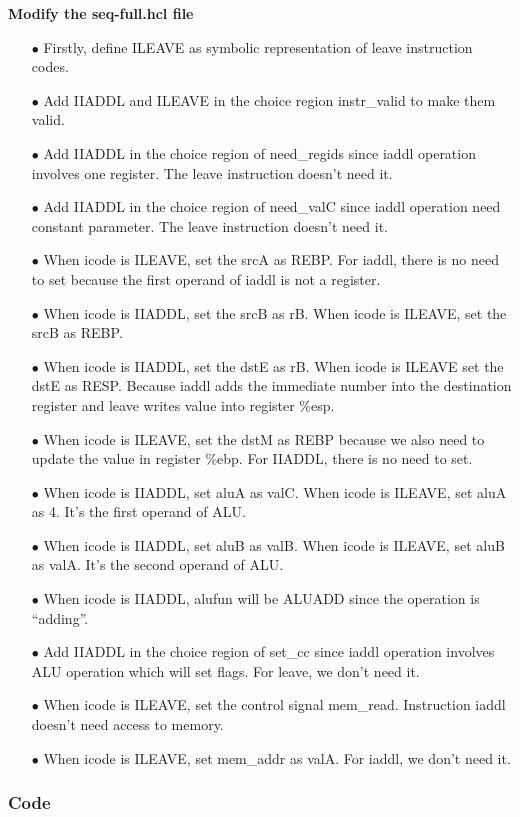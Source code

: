 \documentclass{article}
\begin{document}
\newpage
{\normalsize\bfseries Modify the {\ttfamily seq-full.hcl} file}
\begin{itemize}
\item[$\bullet$]Firstly, define ILEAVE as symbolic representation of leave instruction codes.
\item[$\bullet$]Add IIADDL and ILEAVE in the choice region instr\_valid to make them valid. 
\item[$\bullet$]Add IIADDL in the choice region of need\_regids since iaddl operation involves one register. The leave instruction doesn’t need it.
\item[$\bullet$]Add IIADDL in the choice region of need\_valC since iaddl operation need constant parameter. The leave instruction doesn’t need it.
\item[$\bullet$]When icode is ILEAVE, set the srcA as REBP. For iaddl, there is no need to set because the first operand of iaddl is not a register.
\item[$\bullet$]When icode is IIADDL, set the srcB as rB. When icode is ILEAVE, set the srcB as REBP.
\item[$\bullet$]When icode is IIADDL, set the dstE as rB. When icode is ILEAVE set the dstE as RESP. Because iaddl adds the immediate number into the destination register and leave writes value into register \%esp.
\item[$\bullet$]When icode is ILEAVE, set the dstM as REBP because we also need to update the value in register \%ebp. For IIADDL, there is no need to set.
\item[$\bullet$]When icode is IIADDL, set aluA as valC. When icode is ILEAVE, set aluA as 4. It’s the first operand of ALU.
\item[$\bullet$]When icode is IIADDL, set aluB as valB. When icode is ILEAVE, set aluB as valA. It’s the second operand of ALU.
\item[$\bullet$]When icode is IIADDL, alufun will be ALUADD since the operation is “adding”.
\item[$\bullet$]Add IIADDL in the choice region of set\_cc since iaddl operation involves ALU operation which will set flags. For leave, we don’t need it.
\item[$\bullet$]When icode is ILEAVE, set the control signal mem\_read. Instruction iaddl doesn’t need access to memory.
\item[$\bullet$]When icode is ILEAVE, set mem\_addr as valA. For iaddl, we don’t need it.
\end{itemize}
\subsubsection{Code}
\end{document}
